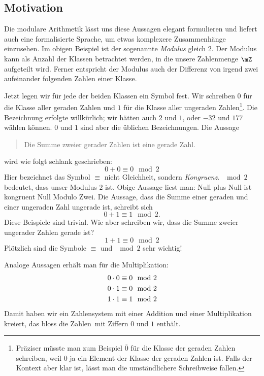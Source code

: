\documentclass[%
11pt,%
twoside,%
titlepage,%
german,%
headsepline%
]{scrartcl}
\begin{document}
\subsection{Motivation}

Die modulare Arithmetik lässt uns diese Aussagen elegant formulieren und liefert auch eine formalisierte Sprache, um etwas komplexere Zusammenhänge einzusehen. Im obigen Beispiel ist der sogenannte \emph{Modulus} gleich $2$. Der Modulus kann als Anzahl der Klassen betrachtet werden, in die unsere Zahlenmenge $\mZ$ aufgeteilt wird. Ferner entspricht der Modulus auch der Differenz von irgend zwei aufeinander folgenden Zahlen einer Klasse.

Jetzt legen wir für jede der beiden Klassen ein Symbol fest. Wir schreiben $0$ für die Klasse aller geraden Zahlen und $1$ für die Klasse aller ungeraden Zahlen\footnote{Präziser müsste man zum Beispiel $\overline{0}$ für die Klasse der geraden Zahlen schreiben, weil $0$ ja ein Element der Klasse der geraden Zahlen ist. Falls der Kontext aber klar ist, lässt man die umständlichere Schreibweise fallen.}. Die Bezeichnung erfolgte willkürlich; wir hätten auch $2$ und $1$, oder $-32$ und $177$ wählen können. $0$ und $1$ sind aber die üblichen Bezeichnungen.
Die Aussage

\begin{quote}
Die Summe zweier gerader Zahlen ist eine gerade Zahl.
\end{quote}

wird wie folgt schlank geschrieben:
$$0+0\equiv0\mod 2$$
Hier bezeichnet das Symbol $\equiv$ nicht Gleichheit, sondern \emph{Kongruenz}. $\mod 2$ bedeutet, dass unser Modulus $2$ ist. Obige Aussage liest man: \glqq Null plus Null ist kongruent Null Modulo Zwei\grqq. Die Aussage, dass die Summe einer geraden und einer ungeraden Zahl ungerade ist, schreibt sich
$$0+1\equiv1\mod2.$$
Diese Beispiele sind trivial. Wie aber schreiben wir, dass die Summe zweier ungerader Zahlen gerade ist?
$$1+1\equiv0\mod2$$
Plötzlich sind die Symbole $\equiv$ und $\mod2$ sehr wichtig!

\noindent Analoge Aussagen erhält man für die Multiplikation:
\begin{align}
0\cdot0\equiv0\mod2\notag\\
0\cdot1\equiv0\mod2\notag\\
1\cdot1\equiv1\mod2\notag
\end{align}
Damit haben wir ein Zahlensystem mit einer Addition und einer Multiplikation kreiert, das bloss die \glqq Zahlen\grqq\  mit Ziffern $0$ und $1$ enthält.
\end{document}
